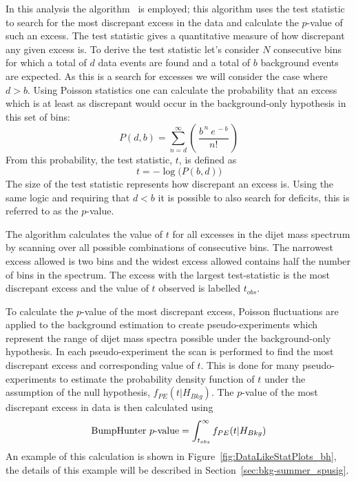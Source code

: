 In this analysis the \bh{} algorithm~\cite{dibjet-bh} is employed;
this algorithm uses the \bh{} test statistic to 
search for the most discrepant excess in the data
and calculate the \mbox{$p$-value} of such an excess.
The \bh{} test statistic gives a quantitative measure of how discrepant any given excess is.
To derive the test statistic let's consider $N$ consecutive bins for which
a total of $d$ data events are found and a total of $b$ background events are expected.
As this is a search for excesses we will consider the case where $d > b$.
Using Poisson statistics one can calculate the probability that an excess which is at least as discrepant
would occur in the background-only hypothesis in this set of bins:
\begin{equation}
  P(d,b) = \sum_{n=d}^{\infty} \left(\,\frac{b^{\,n}~e^{\,-b}}{n!}\,\right)
\end{equation}
From this probability, the \bh{} test statistic, $t$, is defined as
\begin{equation}
 t = -\log{\big(P(b,d)\big)}
\end{equation}
The size of the test statistic represents how discrepant an excess is.
Using the same logic and requiring that $d < b$ it is possible to also search for deficits,
this is referred to as the \dhunt{} \mbox{$p$-value}.

The \bh{} algorithm calculates the value of $t$ for all excesses in the dijet mass spectrum
by scanning over all possible combinations of consecutive bins.
The narrowest excess allowed is two bins and the widest excess allowed contains half the number of bins in the spectrum.
The excess with the largest \bh{} test-statistic is the most discrepant excess and the value of $t$ observed is labelled $t_{obs}$.

To calculate the \mbox{$p$-value} of the most discrepant excess,
Poisson fluctuations are applied to the background estimation to create pseudo-experiments
which represent the range of dijet mass spectra possible under the background-only hypothesis.
In each pseudo-experiment the \bh{} scan is performed to find the most discrepant excess and corresponding value of $t$.
This is done for many pseudo-experiments to estimate the probability density function of $t$ under the assumption of the null hypothesis, $f_{PE}(t| H_{Bkg})$.
The \bh{} \mbox{$p$-value} of the most discrepant excess in data is then calculated using
\begin{equation}
  \text{BumpHunter{}}~p\text{-value} = \int_{t_{obs}}^\infty f_{PE}(t | H_{Bkg})
\end{equation}
An example of this calculation is shown in Figure~\ref{fig:DataLikeStatPlots_bh},
the details of this example will be described in Section~\ref{sec:bkg-summer_spusig}.

